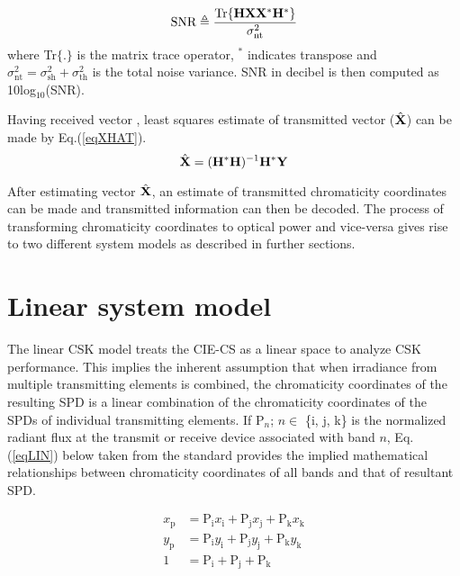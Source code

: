 \begin{equation}
	\text{SNR} \triangleq \frac{\text{Tr}\{{\bf{H}}{\bf{X}}{\bf{X}}^{*}{\bf{H}}^{*}\}}{\sigma^{2}_{\text{nt}}}
	\label{eqSNR}
\end{equation}
where Tr$\{.\}$ is the matrix trace operator, $^{*}$ indicates transpose and $\sigma^{2}_{\text{nt}}=\sigma^{2}_{\text{sh}}+\sigma^{2}_{\text{th}}$ is the total noise variance. SNR in decibel is then computed as 10log$^{ }_{10}$(SNR).

Having received vector , least squares estimate of transmitted vector ($\hat{{\bf{X}}}$) can be made by Eq.(\ref{eqXHAT}).
\begin{equation}
	\hat{{\bf{X}}} = ({\bf{H}}^{*}{\bf{H}})^{-1}{\bf{H}}^{*}{\bf{Y}}
	\label{eqXHAT}
\end{equation}

After estimating vector $\hat{{\bf{X}}}$, an estimate of transmitted chromaticity coordinates can be made and transmitted information can then be decoded. The process of transforming chromaticity coordinates to optical power and vice-versa gives rise to two different system models as described in further sections.

\section{Linear system model}
\label{sec:cskLinear}
The linear CSK model treats the CIE-CS as a linear space to analyze CSK performance. This implies the inherent assumption that when irradiance from multiple transmitting elements is combined, the chromaticity coordinates of the resulting SPD is a linear combination of the chromaticity coordinates of the SPDs of individual transmitting elements. If P$_{n}$; $n\in$ \{i, j, k\} is the normalized radiant flux at the transmit or receive device associated with band $n$, Eq.(\ref{eqLIN}) below taken from the standard provides the implied mathematical relationships between chromaticity coordinates of all bands and that of resultant SPD.

\begin{equation}
	\begin{aligned}
	x_{\text{p}} &= \text{P}_{\text{i}}x_{\text{i}} + \text{P}_{\text{j}}x_{\text{j}} + \text{P}_{\text{k}}x_{\text{k}}\\
	y_{\text{p}} &= \text{P}_{\text{i}}y_{\text{i}} + \text{P}_{\text{j}}y_{\text{j}} + \text{P}_{\text{k}}y_{\text{k}}\\
	1 &= \text{P}_{\text{i}} + \text{P}_{\text{j}} + \text{P}_{\text{k}}
\end{aligned}
\label{eqLIN}
\end{equation}

